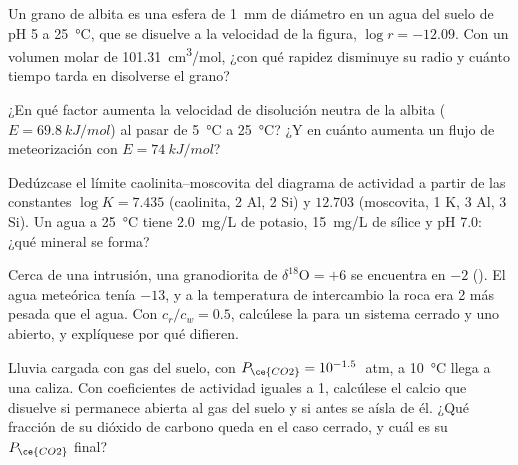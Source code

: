 \begin{exercise}[$\star\star$]\label{exo:b3:water-rock-interaction:7}
Un grano de albita es una esfera de \qty{1}{mm} de diámetro en un agua del suelo de pH 5 a
\qty{25}{\celsius}, que se disuelve a la velocidad de la figura, $\log r = -12.09$.
Con un volumen molar de \qty{101.31}{cm^3/mol}, ¿con qué rapidez disminuye
su radio y cuánto tiempo tarda en disolverse el grano?
\end{exercise}

\begin{exercise}[$\star\star$]\label{exo:b3:water-rock-interaction:8}
¿En qué factor aumenta la velocidad de disolución neutra de la albita ($E =
\qty{69.8}{kJ/mol}$) al pasar de \qty{5}{\celsius} a \qty{25}{\celsius}? ¿Y
en cuánto aumenta un flujo de meteorización con $E = \qty{74}{kJ/mol}$?
\end{exercise}

\begin{exercise}[$\star\star$]\label{exo:b3:water-rock-interaction:9}
Dedúzcase el límite caolinita--moscovita del diagrama de actividad a partir de las
constantes $\log K = 7.435$ (caolinita, 2 Al, 2 Si) y $12.703$ (moscovita, 1
K, 3 Al, 3 Si). Un agua a \qty{25}{\celsius} tiene \qty{2.0}{mg/L} de
potasio, \qty{15}{mg/L} de sílice y pH 7.0: ¿qué mineral se forma?
\end{exercise}

\begin{exercise}[$\star\star\star$]\label{exo:b3:water-rock-interaction:10}
Cerca de una intrusión, una granodiorita de $\delta^{18}\mathrm O = +6$ se encuentra
en $-2$ (\unit{\permil}). El agua meteórica tenía $-13$, y a la temperatura de
intercambio la roca era \qty{2}{\permil} más pesada que el
agua. Con $c_r/c_w = 0.5$, calcúlese la  para un sistema cerrado y
uno abierto, y explíquese por qué difieren.
\end{exercise}

\begin{exercise}[$\star\star\star$]\label{exo:b3:water-rock-interaction:11}
Lluvia cargada con gas del suelo, con $P_{\ce{CO2}} = 10^{-1.5}$~atm, a
\qty{10}{\celsius} llega a una caliza. Con coeficientes de actividad iguales a 1,
calcúlese el calcio que disuelve si permanece abierta al gas del suelo y si antes
se aísla de él. ¿Qué fracción de su dióxido de carbono queda en el
caso cerrado, y cuál es su $P_{\ce{CO2}}$ final?
\end{exercise}

